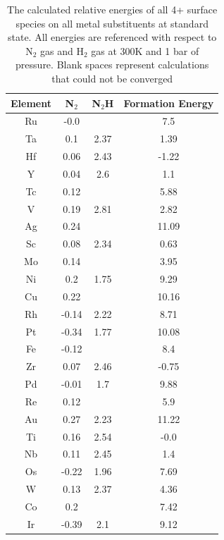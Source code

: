\begin{table}
\begin{center}
\begin{tabular}{| c | c | c | c |}
\hline
Element & N$_2$ & N$_2$H & Formation Energy \\
\hline
Ru & -0.0 &  & 7.5 \\
Ta & 0.1 & 2.37 & 1.39 \\
Hf & 0.06 & 2.43 & -1.22 \\
Y & 0.04 & 2.6 & 1.1 \\
Tc & 0.12 &  & 5.88 \\
V & 0.19 & 2.81 & 2.82 \\
Ag & 0.24 &  & 11.09 \\
Sc & 0.08 & 2.34 & 0.63 \\
Mo & 0.14 &  & 3.95 \\
Ni & 0.2 & 1.75 & 9.29 \\
Cu & 0.22 &  & 10.16 \\
Rh & -0.14 & 2.22 & 8.71 \\
Pt & -0.34 & 1.77 & 10.08 \\
Fe & -0.12 &  & 8.4 \\
Zr & 0.07 & 2.46 & -0.75 \\
Pd & -0.01 & 1.7 & 9.88 \\
Re & 0.12 &  & 5.9 \\
Au & 0.27 & 2.23 & 11.22 \\
Ti & 0.16 & 2.54 & -0.0 \\
Nb & 0.11 & 2.45 & 1.4 \\
Os & -0.22 & 1.96 & 7.69 \\
W & 0.13 & 2.37 & 4.36 \\
Co & 0.2 &  & 7.42 \\
Ir & -0.39 & 2.1 & 9.12 \\
\hline
\end{tabular}
\end{center}
\label{table:4+_energies}
\caption{The calculated relative energies of all 4+ surface species on all metal substituents at standard state. All energies are referenced with respect to N$_2$ gas and H$_2$ gas at 300K and 1 bar of pressure. Blank spaces represent calculations that could not be converged}
\end{table}

